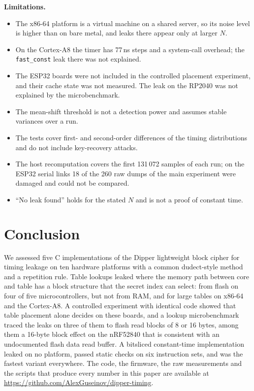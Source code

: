 \documentclass[11pt, a4paper, twoside, reqno]{article}
\newcommand{\tfc}{\texttt{fast\_const}}
\begin{document}
\textbf{Limitations.}
\begin{itemize}
\item The x86-64 platform is a virtual machine on a shared server, so its noise level is higher than on bare metal, and leaks there appear only at larger $N$.
\item On the Cortex-A8 the timer has 77\,ns steps and a system-call overhead; the \tfc{} leak there was not explained.
\item The ESP32 boards were not included in the controlled placement experiment, and their cache state was not measured. The leak on the RP2040 was not explained by the microbenchmark.
\item The mean-shift threshold is not a detection power and assumes stable variances over a run.
\item The tests cover first- and second-order differences of the timing distributions and do not include key-recovery attacks.
\item The host recomputation covers the first 131\,072 samples of each run; on the ESP32 serial links 18 of the 260 raw dumps of the main experiment were damaged and could not be compared.
\item ``No leak found'' holds for the stated $N$ and is not a proof of constant time.
\end{itemize}

\section{Conclusion}

We assessed five C implementations of the Dipper lightweight block cipher for timing leakage on ten hardware platforms with a common dudect-style method and a repetition rule. Table lookups leaked where the memory path between core and table has a block structure that the secret index can select: from flash on four of five microcontrollers, but not from RAM, and for large tables on x86-64 and the Cortex-A8. A controlled experiment with identical code showed that table placement alone decides on these boards, and a lookup microbenchmark traced the leaks on three of them to flash read blocks of 8 or 16 bytes, among them a 16-byte block effect on the nRF52840 that is consistent with an undocumented flash data read buffer. A bitsliced constant-time implementation leaked on no platform, passed static checks on six instruction sets, and was the fastest variant everywhere. The code, the firmware, the raw measurements and the scripts that produce every number in this paper are available at \url{https://github.com/AlexGuseinov/dipper-timing}.
\end{document}
